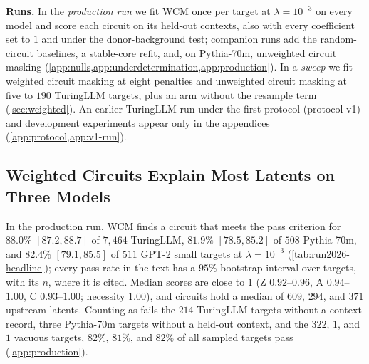\documentclass[10pt]{article}
\begin{document}
\textbf{Runs.}
In the \emph{production run} we fit WCM once per target at $\lambda = 10^{-3}$ on every model and score each circuit on its held-out contexts, also with every coefficient set to $1$ and under the donor-background test; companion runs add the random-circuit baselines, a stable-core refit, and, on Pythia-70m, unweighted circuit masking (\cref{app:nulls,app:underdetermination,app:production}).
In a \emph{sweep} we fit weighted circuit masking at eight penalties and unweighted circuit masking at five to $190$ TuringLLM targets, plus an arm without the resample term (\cref{sec:weighted}).
An earlier TuringLLM run under the first protocol (protocol-v1) and development experiments appear only in the appendices (\cref{app:protocol,app:v1-run}).

\subsection{Weighted Circuits Explain Most Latents on Three Models}
\label{sec:main-result}
In the production run, WCM finds a circuit that meets the pass criterion for $88.0\%$ $[87.2, 88.7]$ of $7{,}464$ TuringLLM, $81.9\%$ $[78.5, 85.2]$ of $508$ Pythia-70m, and $82.4\%$ $[79.1, 85.5]$ of $511$ GPT-2 small targets at $\lambda = 10^{-3}$ (\cref{tab:run2026-headline}); every pass rate in the text has a $95\%$ bootstrap interval over targets, with its $n$, where it is cited.
Median scores are close to $1$ (Z $0.92$--$0.96$, A $0.94$--$1.00$, C $0.93$--$1.00$; necessity $1.00$), and circuits hold a median of $609$, $294$, and $371$ upstream latents.
Counting as fails the $214$ TuringLLM targets without a context record, three Pythia-70m targets without a held-out context, and the $322$, $1$, and $1$ vacuous targets, $82\%$, $81\%$, and $82\%$ of all sampled targets pass (\cref{app:production}).
\end{document}
